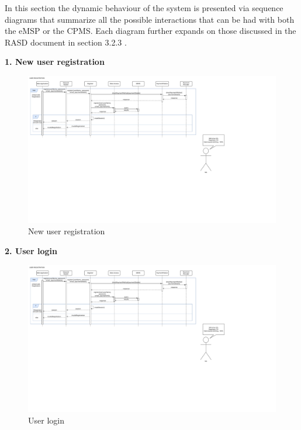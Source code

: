 \documentclass[11pt]{article}
\begin{document}
In this section the dynamic behaviour of the system is presented via sequence diagrams that summarize all the possible interactions that can be had with both the eMSP or the CPMS. Each diagram further expands on those discussed in the RASD document in section 3.2.3 .

\begin{description}
    \item \textbf{1. New user registration}
    \begin{figure}[!ht]
        \centering
        \includegraphics[page={1}, trim=0cm 18cm 16cm 1cm, width=\linewidth, clip]{RuntimeDiagrams.pdf}
        \caption{New user registration}
    \end{figure}
    
    \item \textbf{2. User login}
    \begin{figure}[!ht]
        \centering
        \includegraphics[page={2}, trim=0cm 20cm 25cm 1cmm, width=\linewidth, clip]{RuntimeDiagrams.pdf}
        \caption{User login}
    \end{figure}
    

\end{description}
\end{document}
